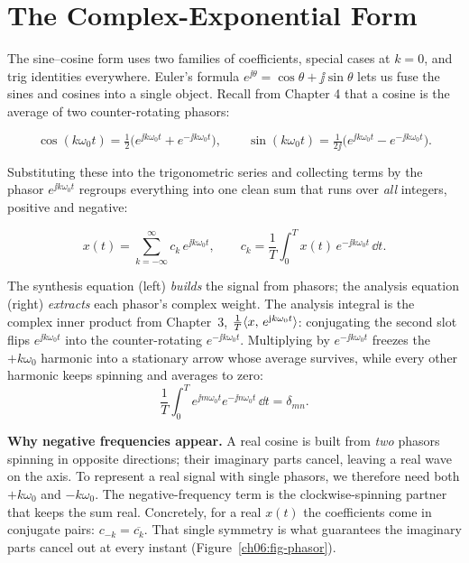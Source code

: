 \section{The Complex-Exponential Form}

The sine--cosine form uses two families of coefficients, special cases at
\(k=0\), and trig identities everywhere. Euler's formula
\(e^{\jj\theta} = \cos\theta + \jj\sin\theta\) lets us fuse the sines and cosines into a
single object. Recall from Chapter 4 that a cosine is the average of two
counter-rotating phasors:

\begin{equation}
\cos(k\omega_0 t) = \tfrac12\bigl(e^{\jj k\omega_0 t} + e^{-\jj k\omega_0 t}\bigr),
\qquad
\sin(k\omega_0 t) = \tfrac1{2\jj}\bigl(e^{\jj k\omega_0 t} - e^{-\jj k\omega_0 t}\bigr).
\label{ch06:euler}
\end{equation}

Substituting these into the trigonometric series and collecting terms by the phasor
\(e^{\jj k\omega_0 t}\) regroups everything into one clean sum that runs over \emph{all}
integers, positive and negative:

\begin{equation}
\boxed{\;x(t) = \sum_{k=-\infty}^{\infty} c_k\, e^{\jj k\omega_0 t},\qquad
c_k = \frac{1}{T}\int_{0}^{T} x(t)\, e^{-\jj k\omega_0 t}\,\dd t.\;}
\label{ch06:complex-fs}
\end{equation}

The synthesis equation (left) \emph{builds} the signal from phasors; the analysis equation
(right) \emph{extracts} each phasor's complex weight. The analysis integral is
the complex inner product from Chapter~3, $\frac{1}{T}\langle x,\, e^{\mathrm{j} k\omega_0 t} \rangle$:
conjugating the second slot flips $e^{\jj k\omega_0 t}$ into the counter-rotating
$e^{-\jj k\omega_0 t}$. Multiplying by $e^{-\jj k\omega_0 t}$ freezes the $+k\omega_0$ harmonic into
a stationary arrow whose average survives, while every other harmonic keeps spinning and averages to
zero:
\[\frac{1}{T}\int_0^T e^{\jj m\omega_0 t}e^{-\jj n\omega_0 t}\,\dd t = \delta_{mn}.\]

\begin{whybox}
\textbf{Why negative frequencies appear.} A real cosine is built from \emph{two} phasors
spinning in opposite directions; their imaginary parts cancel, leaving a real wave on the
axis. To represent a real signal with single phasors, we therefore need both
\(+k\omega_0\) and \(-k\omega_0\). The negative-frequency term is the
clockwise-spinning partner that keeps the sum real. Concretely, for a real \(x(t)\) the
coefficients come in conjugate pairs: \(c_{-k} = \overline{c_k}\). That single symmetry is
what guarantees the imaginary parts cancel out at every instant (Figure~\ref{ch06:fig-phasor}).
\end{whybox}


